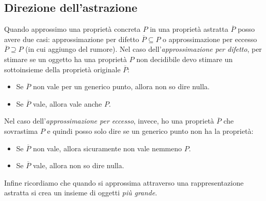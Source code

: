 \documentclass[a4paper,oneside,titlepage]{book}
\begin{document}
\subsection{Direzione dell'astrazione}
Quando approssimo una proprietà concreta $P$ in una proprietà astratta $\overline{P}$ posso avere due casi: approssimazione per difetto $\overline{P} \subseteq P$ o approssimazione per eccesso $\overline{P} \supseteq P$ (in cui aggiungo del rumore). Nel caso dell'\textit{approssimazione per difetto}, per stimare se un oggetto ha una proprietà $P$ non decidibile devo stimare un sottoinsieme della proprietà originale $\overline{P}$:
\begin{itemize}
    \item Se $\overline{P}$ non vale per un generico punto, allora non so dire nulla.
    \item Se $\overline{P}$ vale, allora vale anche $P$.
\end{itemize}
Nel caso dell'\textit{approssimazione per eccesso}, invece, ho una proprietà $\overline{P}$ che sovrastima $P$ e quindi posso solo dire se un generico punto non ha la proprietà:
\begin{itemize}
    \item Se $\overline{P}$ non vale, allora sicuramente non vale nemmeno $P$.
    \item Se $\overline{P}$ vale, allora non so dire nulla.
\end{itemize}
Infine ricordiamo che quando si approssima attraverso una rappresentazione astratta si crea un insieme di oggetti \textit{più grande}.
\end{document}
